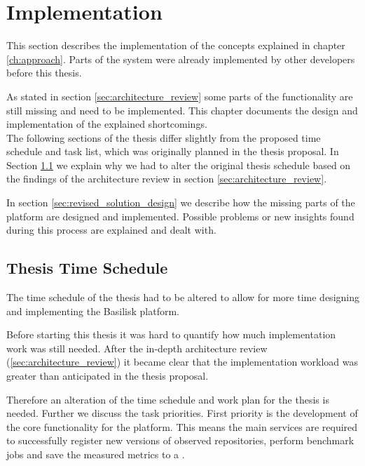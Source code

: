 \chapter{Implementation}
\label{ch:implementation}



This section describes the implementation of the concepts explained in chapter \ref{ch:approach}.
Parts of the system were already implemented by other developers before this thesis.

As stated in section \ref{sec:architecture_review} some parts of the functionality are still missing and need to be implemented.
This chapter documents the design and implementation of the explained shortcomings.
\\

The following sections of the thesis differ slightly from the proposed time schedule and task list, which was originally planned in the thesis proposal.
In Section \ref{sec:time_schedule} we explain why we had to alter the original thesis schedule based on the findings of the architecture review in section \ref{sec:architecture_review}.


In section \ref{sec:revised_solution_design} we describe how the missing parts of the platform are designed and implemented.
Possible problems or new insights found during this process are explained and dealt with.



\section{Thesis Time Schedule}
\label{sec:time_schedule}
The time schedule of the thesis had to be altered to allow for more time designing and implementing the Basilisk platform.

Before starting this thesis it was hard to quantify how much implementation work was still needed.
After the in-depth architecture review (\ref{sec:architecture_review}) it became clear that the implementation workload was greater than anticipated in the thesis proposal.

Therefore an alteration of the time schedule and work plan for the thesis is needed.
Further we discuss the task priorities.
First priority is the development of the core functionality for the platform.
This means the main services are required to successfully register new versions of observed repositories, perform benchmark jobs and save the measured metrics to a \ts{}.


